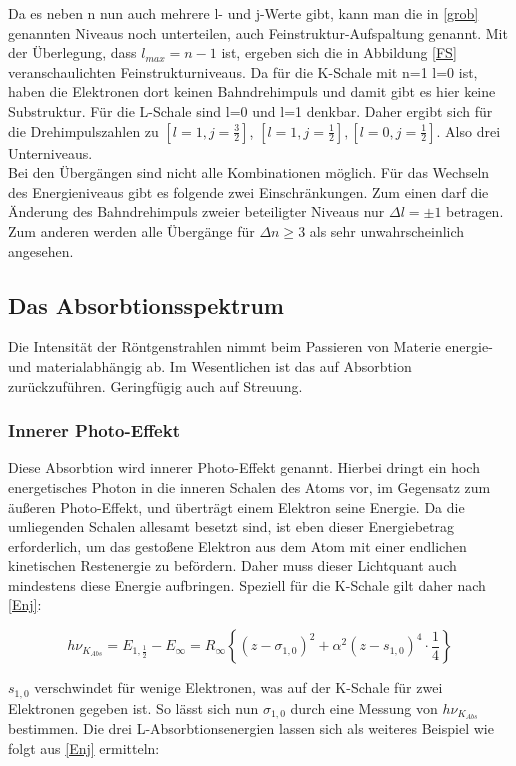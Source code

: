 Da es neben n nun auch mehrere l- und j-Werte gibt, kann man die in \ref{grob} genannten Niveaus noch unterteilen, auch 
Feinstruktur-Aufspaltung genannt. Mit der Überlegung, dass $l_{max} = n-1$ ist, ergeben sich die in Abbildung \eqref{FS}
veranschaulichten Feinstrukturniveaus. Da für die K-Schale mit n=1 l=0 ist, haben die Elektronen dort keinen Bahndrehimpuls
und damit gibt es hier keine Substruktur. Für die L-Schale sind l=0 und l=1 denkbar. Daher ergibt sich für die Drehimpulszahlen
zu $[l=1,j=\frac32]$, $[l=1,j=\frac12],[l=0,j=\frac12] $. Also drei Unterniveaus.\\
Bei den Übergängen sind nicht alle Kombinationen möglich. Für das Wechseln des Energieniveaus gibt es folgende zwei Einschränkungen.
Zum einen darf die Änderung des Bahndrehimpuls zweier beteiligter Niveaus nur $\Delta l = \pm1$ betragen. Zum anderen werden
alle Übergänge für $\Delta n \ge 3$ als sehr unwahrscheinlich angesehen.

\subsection{Das Absorbtionsspektrum}
Die Intensität der Röntgenstrahlen nimmt beim Passieren von Materie energie- und materialabhängig ab. Im Wesentlichen 
ist das auf Absorbtion zurückzuführen. Geringfügig auch auf Streuung.
\subsubsection{Innerer Photo-Effekt}
Diese Absorbtion wird innerer Photo-Effekt genannt. Hierbei dringt ein hoch energetisches Photon in die inneren Schalen
des Atoms vor, im Gegensatz zum äußeren Photo-Effekt, und überträgt einem Elektron seine Energie. Da die umliegenden Schalen
allesamt besetzt sind, ist eben dieser Energiebetrag erforderlich, um das gestoßene Elektron aus dem Atom mit einer endlichen
kinetischen Restenergie zu befördern. Daher muss dieser Lichtquant auch mindestens diese Energie aufbringen. Speziell für die
K-Schale gilt daher nach \eqref{Enj}:

\begin{equation}
 h\nu_{K_{Abs}} = E_{1,\frac12} - E_{\infty} = R_{\infty}\left\{(z-\sigma_{1,0})^2 + \alpha^2(z - s_{1,0})^4\cdot \frac14\right\}
 \label{K1}
\end{equation}

$s_{1,0}$ verschwindet für wenige Elektronen, was auf der K-Schale für zwei Elektronen gegeben ist. So lässt sich nun $\sigma_{1,0}$
durch eine Messung von $h\nu_{K_{Abs}}$ bestimmen. Die drei L-Absorbtionsenergien lassen sich als weiteres Beispiel wie folgt 
aus \eqref{Enj} ermitteln:

